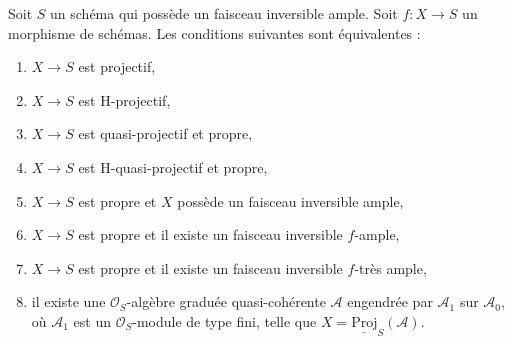 \begin{lemma}
\label{lemma-projective}
Soit $S$ un schéma qui possède un faisceau inversible ample.
Soit $f : X \to S$ un morphisme de schémas. Les conditions suivantes sont
équivalentes :
\begin{enumerate}
\item $X \to S$ est projectif,
\item $X \to S$ est H-projectif,
\item $X \to S$ est quasi-projectif et propre,
\item $X \to S$ est H-quasi-projectif et propre,
\item $X \to S$ est propre et $X$ possède un faisceau inversible ample,
\item $X \to S$ est propre et il existe un faisceau inversible $f$-ample,
\item $X \to S$ est propre et il existe un faisceau inversible $f$-très ample,
\item il existe une $\mathcal{O}_S$-algèbre graduée quasi-cohérente $\mathcal{A}$
engendrée par $\mathcal{A}_1$ sur $\mathcal{A}_0$, où $\mathcal{A}_1$ est un
$\mathcal{O}_S$-module de type fini, telle que
$X = \underline{\text{Proj}}_S(\mathcal{A})$.
\end{enumerate}
\end{lemma}

